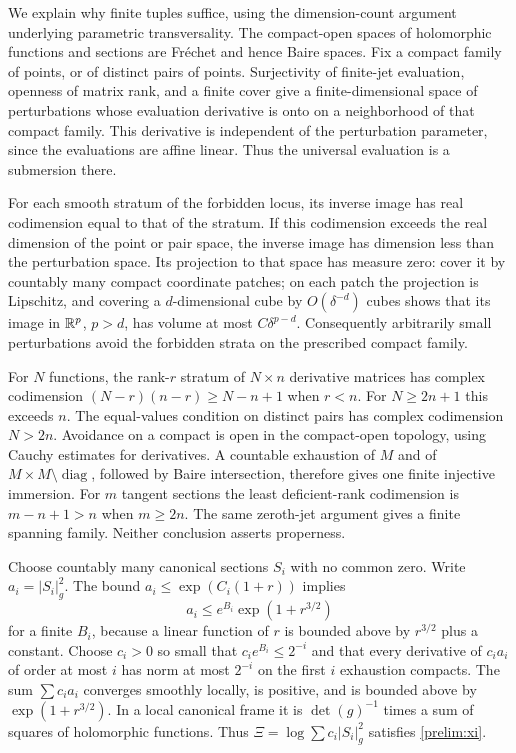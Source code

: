We explain why finite tuples suffice, using the dimension-count
argument underlying parametric transversality.
The compact-open spaces of holomorphic functions and sections are
Fr\'echet and hence Baire spaces. Fix a compact family of points,
or of distinct pairs of points. Surjectivity of finite-jet evaluation,
openness of matrix rank, and a finite cover give a finite-dimensional
space of perturbations whose evaluation derivative is onto on a
neighborhood of that compact family. This derivative is independent
of the perturbation parameter, since the evaluations are affine
linear. Thus the universal evaluation is a submersion there.

For each smooth stratum of the forbidden locus, its inverse image
has real codimension equal to that of the stratum. If this codimension
exceeds the real dimension of the point or pair space, the inverse
image has dimension less than the perturbation space. Its projection
to that space has measure zero: cover it by countably many compact
coordinate patches; on each patch the projection is Lipschitz, and
covering a $d$-dimensional cube by $O(\delta^{-d})$ cubes shows that
its image in $\mathbb R^p$, $p>d$, has volume at most $C\delta^{p-d}$.
Consequently arbitrarily small perturbations avoid the forbidden
strata on the prescribed compact family.

For $N$ functions, the rank-$r$ stratum of $N\times n$ derivative
matrices has complex codimension $(N-r)(n-r)\ge N-n+1$ when $r<n$.
For $N\ge2n+1$ this exceeds $n$.
The equal-values condition on distinct pairs has complex codimension
$N>2n$. Avoidance on a compact is open in the compact-open topology,
using Cauchy estimates for derivatives. A countable exhaustion of
$M$ and of $M\times M\setminus\operatorname{diag}$, followed by Baire
intersection, therefore gives one finite injective immersion.
For $m$ tangent sections the least deficient-rank codimension is
$m-n+1>n$ when $m\ge2n$. The same zeroth-jet argument gives a finite
spanning family. Neither conclusion asserts properness.

Choose countably many canonical sections $S_i$ with no common zero.
Write $a_i=|S_i|_g^2$.  The bound
$a_i\le\exp(C_i(1+r))$ implies
\[
 a_i\le e^{B_i}\exp(1+r^{3/2})
\]
for a finite $B_i$, because a linear function of $r$ is bounded above
by $r^{3/2}$ plus a constant.  Choose $c_i>0$ so small that
$c_ie^{B_i}\le2^{-i}$ and that every derivative of $c_i a_i$ of order
at most $i$ has norm at most $2^{-i}$ on the first $i$ exhaustion
compacts.  The sum $\sum c_i a_i$ converges smoothly locally, is
positive, and is bounded above by $\exp(1+r^{3/2})$.  In a local
canonical frame it is $\det(g)^{-1}$ times a sum of squares of
holomorphic functions.  Thus
$\Xi=\log\sum c_i|S_i|_g^2$ satisfies \eqref{prelim:xi}.

